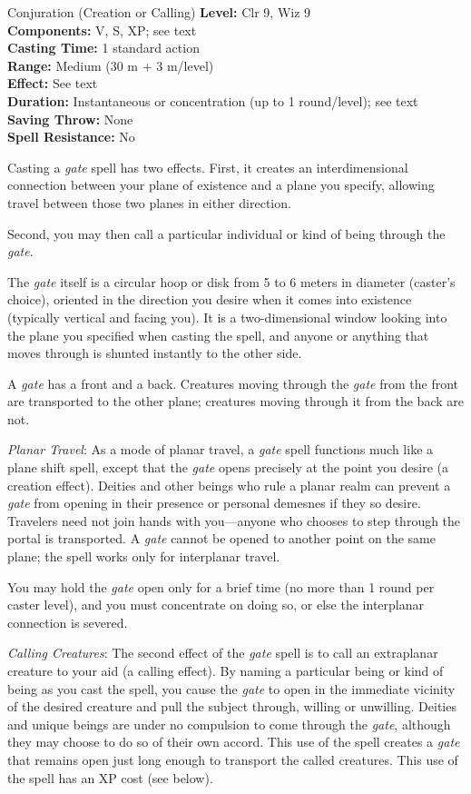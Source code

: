 {Conjuration (Creation or Calling)}
{
	\textbf{Level:}
	Clr 9, Wiz 9\\
	\textbf{Components:}
	V, S, XP; see text\\
	\textbf{Casting Time:}
	1 standard action\\
	\textbf{Range:}
	Medium (30 m + 3 m/level)\\
	\textbf{Effect:}
	See text\\
	\textbf{Duration:}
	Instantaneous or concentration (up to 1 round/level); see text\\
	\textbf{Saving Throw:}
	None\\
	\textbf{Spell Resistance:}
	No\\
}
{
	Casting a \emph{gate} spell has two effects. First, it creates an interdimensional connection between your plane of existence and a plane you specify, allowing travel between those two planes in either direction.

	Second, you may then call a particular individual or kind of being through the \emph{gate}.

	The \emph{gate} itself is a circular hoop or disk from 5 to 6 meters in diameter (caster's choice), oriented in the direction you desire when it comes into existence (typically vertical and facing you). It is a two-dimensional window looking into the plane you specified when casting the spell, and anyone or anything that moves through is shunted instantly to the other side.

	A \emph{gate} has a front and a back. Creatures moving through the \emph{gate} from the front are transported to the other plane; creatures moving through it from the back are not.

	\textit{Planar Travel}:
	As a mode of planar travel, a \emph{gate} spell functions much like a plane shift spell, except that the \emph{gate} opens precisely at the point you desire (a creation effect). Deities and other beings who rule a planar realm can prevent a \emph{gate} from opening in their presence or personal demesnes if they so desire. Travelers need not join hands with you---anyone who chooses to step through the portal is transported. A \emph{gate} cannot be opened to another point on the same plane; the spell works only for interplanar travel.

	You may hold the \emph{gate} open only for a brief time (no more than 1 round per caster level), and you must concentrate on doing so, or else the interplanar connection is severed.

	\textit{Calling Creatures}:
	The second effect of the \emph{gate} spell is to call an extraplanar creature to your aid (a calling effect). By naming a particular being or kind of being as you cast the spell, you cause the \emph{gate} to open in the immediate vicinity of the desired creature and pull the subject through, willing or unwilling. Deities and unique beings are under no compulsion to come through the \emph{gate}, although they may choose to do so of their own accord. This use of the spell creates a \emph{gate} that remains open just long enough to transport the called creatures. This use of the spell has an XP cost (see below).

}
